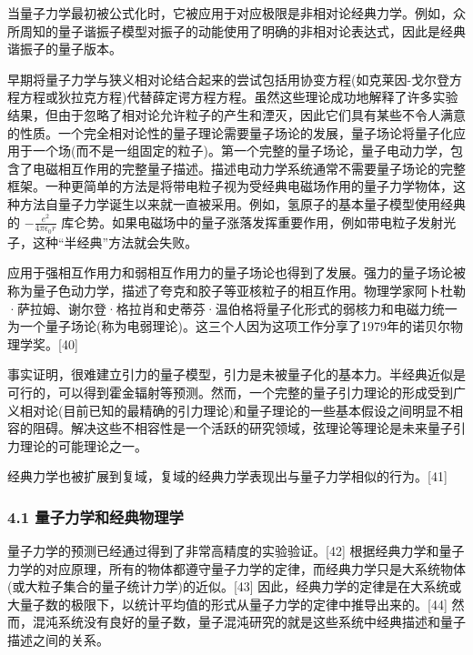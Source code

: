 当量子力学最初被公式化时，它被应用于对应极限是非相对论经典力学。例如，众所周知的量子谐振子模型对振子的动能使用了明确的非相对论表达式，因此是经典谐振子的量子版本。

早期将量子力学与狭义相对论结合起来的尝试包括用协变方程(如克莱因-戈尔登方程方程或狄拉克方程)代替薛定谔方程方程。虽然这些理论成功地解释了许多实验结果，但由于忽略了相对论允许粒子的产生和湮灭，因此它们具有某些不令人满意的性质。一个完全相对论性的量子理论需要量子场论的发展，量子场论将量子化应用于一个场(而不是一组固定的粒子)。第一个完整的量子场论，量子电动力学，包含了电磁相互作用的完整量子描述。描述电动力学系统通常不需要量子场论的完整框架。一种更简单的方法是将带电粒子视为受经典电磁场作用的量子力学物体，这种方法自量子力学诞生以来就一直被采用。例如，氢原子的基本量子模型使用经典的 $-\frac{e^2}{4 \pi \epsilon_0 r}$
  库仑势。如果电磁场中的量子涨落发挥重要作用，例如带电粒子发射光子，这种“半经典”方法就会失败。

应用于强相互作用力和弱相互作用力的量子场论也得到了发展。强力的量子场论被称为量子色动力学，描述了夸克和胶子等亚核粒子的相互作用。物理学家阿卜杜勒·萨拉姆、谢尔登·格拉肖和史蒂芬·温伯格将量子化形式的弱核力和电磁力统一为一个量子场论(称为电弱理论)。这三个人因为这项工作分享了1979年的诺贝尔物理学奖。[40]

事实证明，很难建立引力的量子模型，引力是未被量子化的基本力。半经典近似是可行的，可以得到霍金辐射等预测。然而，一个完整的量子引力理论的形成受到广义相对论(目前已知的最精确的引力理论)和量子理论的一些基本假设之间明显不相容的阻碍。解决这些不相容性是一个活跃的研究领域，弦理论等理论是未来量子引力理论的可能理论之一。

经典力学也被扩展到复域，复域的经典力学表现出与量子力学相似的行为。[41]

\subsubsection{4.1 量子力学和经典物理学}
量子力学的预测已经通过得到了非常高精度的实验验证。[42] 根据经典力学和量子力学的对应原理，所有的物体都遵守量子力学的定律，而经典力学只是大系统物体(或大粒子集合的量子统计力学)的近似。[43] 因此，经典力学的定律是在大系统或大量子数的极限下，以统计平均值的形式从量子力学的定律中推导出来的。[44] 然而，混沌系统没有良好的量子数，量子混沌研究的就是这些系统中经典描述和量子描述之间的关系。

